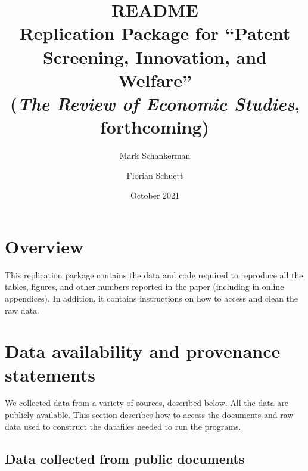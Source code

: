 \documentclass[a4paper,11pt]{article}
\author{Mark Schankerman \and Florian Schuett}
\title{README \\ Replication Package for ``Patent Screening, Innovation, and Welfare'' \\ (\emph{The Review of Economic Studies}, forthcoming)}
\date{October 2021}
\begin{document}
\maketitle

\section{Overview}

This replication package contains the data and code required to reproduce all the tables, figures, and other numbers reported in the paper (including in online appendices). In addition, it contains instructions on how to access and clean the raw data.

\section{Data availability and provenance statements} \label{sec:DAS}

We collected data from a variety of sources, described below. All the data are publicly available. This section describes how to access the documents and raw data used to construct the datafiles needed to run the programs.

\subsection{Data collected from public documents}
\end{document}
